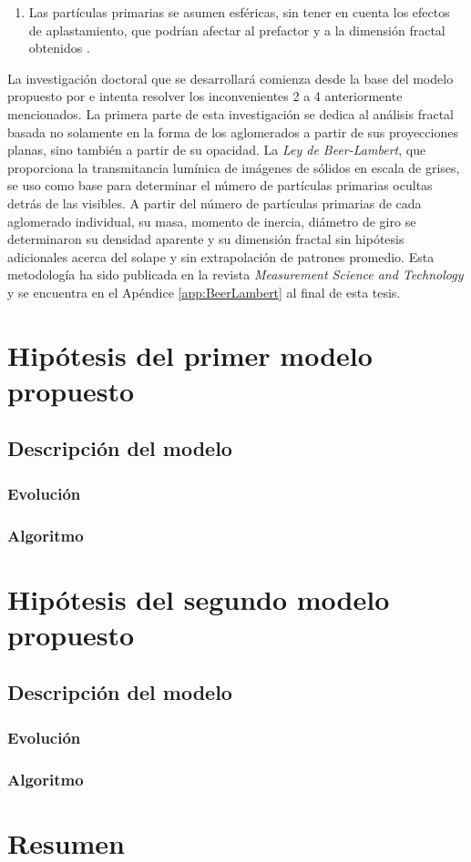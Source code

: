 \begin{enumerate}
\item Las partículas primarias se asumen esféricas, sin tener en cuenta los efectos de aplastamiento, que podrían afectar al prefactor y a la dimensión fractal obtenidos \cite{ohetal:1997,brasiletal:1999,alzaitoneetal:2009}.
\end{enumerate}

\par La investigación doctoral que se desarrollará comienza desde la base del modelo propuesto por \cite{lapuertaetal:2006} e intenta resolver los inconvenientes 2 a 4 anteriormente mencionados. La primera parte de esta investigación se dedica al análisis fractal  basada no solamente en la forma de los aglomerados a partir de sus proyecciones planas, sino también a partir de su opacidad. La \emph{Ley de Beer-Lambert}, que proporciona la transmitancia lumínica de imágenes de sólidos en escala de grises, se uso como base para determinar el número de partículas primarias ocultas detrás de las visibles. A partir del número de partículas primarias de cada aglomerado individual, su masa, momento de inercia, diámetro de giro se determinaron su densidad aparente y su dimensión fractal sin hipótesis adicionales acerca del solape y sin extrapolación de patrones promedio. Esta metodología ha sido publicada en la revista \textit{Measurement Science and Technology} y se encuentra en el Apéndice \ref{app:BeerLambert} al final de esta tesis.

\section{Hipótesis del primer modelo propuesto}\label{sec:HipotesisPrimerModelo}
\subsection{Descripción del modelo}
\subsubsection{Evolución}
\subsubsection{Algoritmo}
\section{Hipótesis del segundo modelo propuesto}\label{sec:HipotesisSegundoModelo}
\subsection{Descripción del modelo}
\subsubsection{Evolución}
\subsubsection{Algoritmo}
\section{Resumen}


\newpage
		
